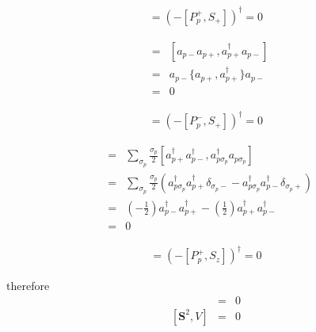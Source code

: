 \documentclass{article}
\begin{document}
\begin{eqnarray*}
[P_p^{-},S_{-}] = \left( - [P_p^{+} , S_{+} ] \right)^{\dagger} = 0
\end{eqnarray*}

\begin{eqnarray*}
[P_p^{-},S_+] &=& [a_{p-} a_{p+} , a_{p+}^{\dagger} a_{p-} ] \\
&=& a_{p-}  \bigl\{ a_{p+} , a_{p+}^{\dagger}  \bigr\} a_{p-} \\
&=& 0
\end{eqnarray*}

\begin{eqnarray*}
[P_p^{+},S_{-}] = \left( - [P_p^{-} , S_{+} ] \right)^{\dagger} = 0
\end{eqnarray*}

\begin{eqnarray*}
[P_p^{+},S_z] &=& \sum_{\sigma_p} \frac{\sigma_p}{2} [a_{p+}^{\dagger} a_{p-}^{\dagger} , a_{p\sigma_p}^{\dagger} a_{p\sigma_p} ] \\
&=& \sum_{\sigma_p} \frac{\sigma_p}{2} \left( a_{p \sigma_p}^{\dagger} a_{p+}^{\dagger} \delta_{\sigma_p-} -  a_{p \sigma_p}^{\dagger} a_{p-}^{\dagger} \delta_{\sigma_p+} \right) \\
&=& \left( -\frac{1}{2}\right) a_{p -}^{\dagger} a_{p+}^{\dagger} - \left( \frac{1}{2} \right) a_{p+}^{\dagger} a_{p-}^{\dagger} \\
&=& 0
\end{eqnarray*}

\begin{eqnarray*}
[P_p^{-},S_z] = \left( - [P_p^{+},S_z] \right)^{\dagger} = 0
\end{eqnarray*}

therefore
\begin{eqnarray*}
[S_z,V] &=& 0 \\
\left[ \bm{S}^2,V \right] &=& 0
\end{eqnarray*}
\end{document}
